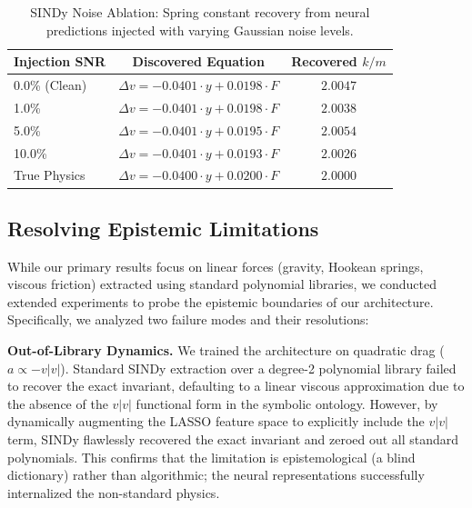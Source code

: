 \documentclass[twoside,11pt]{article}
\begin{document}
\begin{table}[h]
\centering
\caption{SINDy Noise Ablation: Spring constant recovery from neural predictions injected with varying Gaussian noise levels.}
\label{tab:noise}
\begin{tabular}{@{}lcc@{}}
\toprule
Injection SNR & Discovered Equation & Recovered $k/m$ \\
\midrule
0.0\% (Clean) & $\Delta v = -0.0401 \cdot y + 0.0198 \cdot F$ & $2.0047$ \\
1.0\% & $\Delta v = -0.0401 \cdot y + 0.0198 \cdot F$ & $2.0038$ \\
5.0\% & $\Delta v = -0.0401 \cdot y + 0.0195 \cdot F$ & $2.0054$ \\
10.0\% & $\Delta v = -0.0401 \cdot y + 0.0193 \cdot F$ & $2.0026$ \\
\midrule
True Physics & $\Delta v = -0.0400 \cdot y + 0.0200 \cdot F$ & $2.0000$ \\
\bottomrule
\end{tabular}
\end{table}

\subsection{Resolving Epistemic Limitations}
\label{sec:resolutions}

While our primary results focus on linear forces (gravity, Hookean springs, viscous friction) extracted using standard polynomial libraries, we conducted extended experiments to probe the epistemic boundaries of our architecture. Specifically, we analyzed two failure modes and their resolutions:

\textbf{Out-of-Library Dynamics.} We trained the architecture on quadratic drag ($a \propto -v|v|$). Standard SINDy extraction over a degree-2 polynomial library failed to recover the exact invariant, defaulting to a linear viscous approximation due to the absence of the $v|v|$ functional form in the symbolic ontology. However, by dynamically augmenting the LASSO feature space to explicitly include the $v|v|$ term, SINDy flawlessly recovered the exact invariant and zeroed out all standard polynomials. This confirms that the limitation is epistemological (a blind dictionary) rather than algorithmic; the neural representations successfully internalized the non-standard physics.
\end{document}
